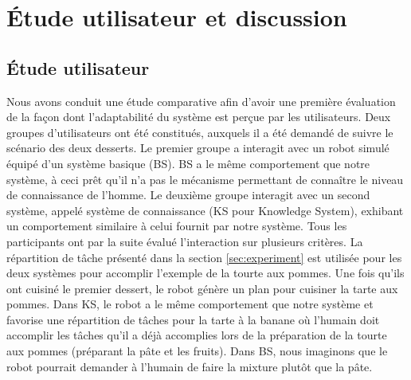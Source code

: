 \documentclass[a4paper,11pt,twoside]{StyleThese}
\begin{document}


\section{Étude utilisateur et discussion}
\label{study}

\subsection{Étude utilisateur}
Nous avons conduit une étude comparative afin d'avoir une première évaluation de la façon dont l'adaptabilité du système est perçue par les utilisateurs. Deux groupes d'utilisateurs ont été constitués, auxquels il a été demandé de suivre le scénario des deux desserts. Le premier groupe a interagit avec un robot simulé équipé d'un système basique (BS). BS a le même comportement que notre système, à ceci prêt qu'il n'a pas le mécanisme permettant de connaître le niveau de connaissance de l'homme. Le deuxième groupe interagit avec un second système, appelé système de connaissance (KS pour Knowledge System), exhibant un comportement similaire à celui fournit par notre système.
Tous les participants ont par la suite évalué l'interaction sur plusieurs critères.
%
La répartition de tâche présenté dans la section \ref{sec:experiment} 
est utilisée pour les deux systèmes pour accomplir l'exemple de la tourte aux pommes. Une fois qu'ils ont cuisiné le premier dessert, le robot génère un plan pour cuisiner la tarte aux pommes. Dans KS, le robot a le même comportement que notre système et favorise une répartition de tâches pour la tarte à la banane où l'humain doit accomplir les tâches qu'il a déjà accomplies lors de la préparation de la tourte aux pommes (préparant la pâte et les fruits).
Dans BS, nous imaginons que le robot pourrait demander à l'humain de faire la mixture plutôt que la pâte.
\end{document}
